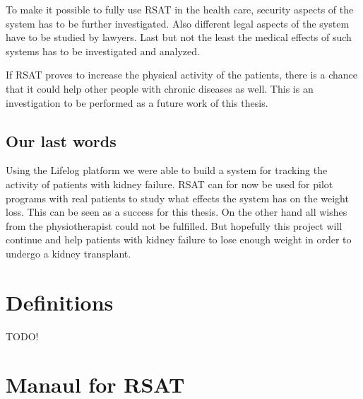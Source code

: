 \documentclass{cslthse-msc}
\begin{document}
To make it possible to fully use RSAT in the health care, security aspects of the system has to be further investigated. Also different legal aspects of the system have to be studied by lawyers. Last but not the least the medical effects of such systems has to be investigated and analyzed. 

If RSAT proves to increase the physical activity of the patients, there is a chance that it could help other people with chronic diseases as well. This is an investigation to be performed as a future work of this thesis.

\section{Our last words}

Using the Lifelog platform we were able to build a system for tracking the activity of patients with kidney failure. RSAT can for now be used for pilot programs with real patients to study what effects the system has on the weight loss. This can be seen as a success for this thesis. On the other hand all wishes from the physiotherapist could not be fulfilled. But hopefully this project will continue and help patients with kidney failure to lose enough weight in order to undergo a kidney transplant.



   

\begin{appendices}
\chapter{Definitions}
TODO!
\chapter{Manaul for RSAT}



\end{appendices}
\end{document}
